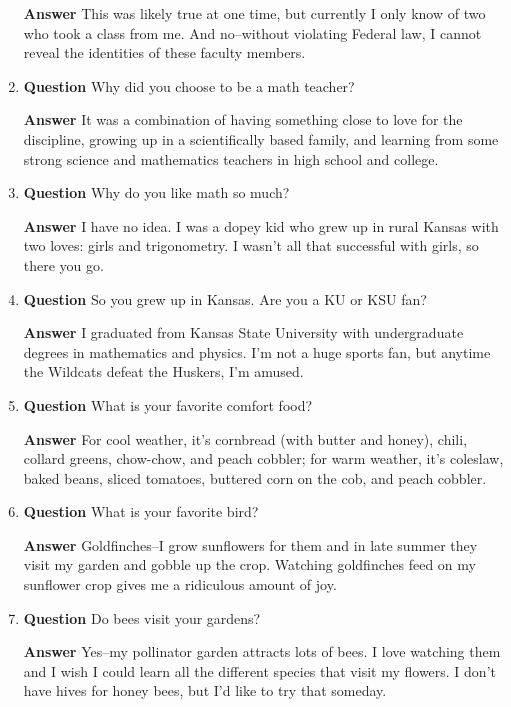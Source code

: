 \documentclass[11pt]{article}
\newcounter{ex}\setcounter{ex}{0}
\begin{document}
\begin{enumerate}
 \textbf{Answer}  This was likely true at one time, but currently I only know of two who 
 took a class from me. And no--without violating Federal law, I cannot reveal the identities of
 these faculty members.

\item  \textbf{Question} Why did you choose to be a math teacher?

\textbf{Answer} It was a combination of having something close to 
love for the discipline, growing up in a scientifically based 
family, and learning from some strong science and mathematics 
teachers in high school and college.


\item \textbf{Question} Why do you like math so much?

\textbf{Answer} I have no idea. I was  a dopey kid who
grew up in rural Kansas with two loves: girls and trigonometry. I wasn't
all that successful with girls, so there you go.

\item \textbf{Question} So you grew up in Kansas. Are you a KU or KSU fan?

\textbf{Answer} I graduated from Kansas State University with 
undergraduate degrees in mathematics and physics. I'm not a huge
sports fan, but anytime the Wildcats defeat the Huskers, I'm 
amused.

\item  \textbf{Question} What is your favorite comfort food?

  \textbf{Answer}  For cool weather, it's cornbread (with butter and honey), chili, collard greens, chow-chow, and peach cobbler; for warm weather, it's coleslaw, baked beans, sliced tomatoes, buttered corn on the cob, and peach cobbler.

  \item  \textbf{Question}  What is your favorite bird?
  
  \textbf{Answer} Goldfinches--I grow sunflowers for them and in late summer
  they visit my garden and gobble up the crop. Watching goldfinches feed on my 
  sunflower
  crop gives me a 
  ridiculous amount of joy.

  \item  \textbf{Question}  Do bees visit your gardens?
  
  \textbf{Answer} Yes--my pollinator garden attracts lots of bees. I love
  watching them and I wish I could learn all the different
  species that visit my flowers. I don't have hives for honey bees, but
  I'd like to try that someday.


\end{enumerate}
\end{document}
